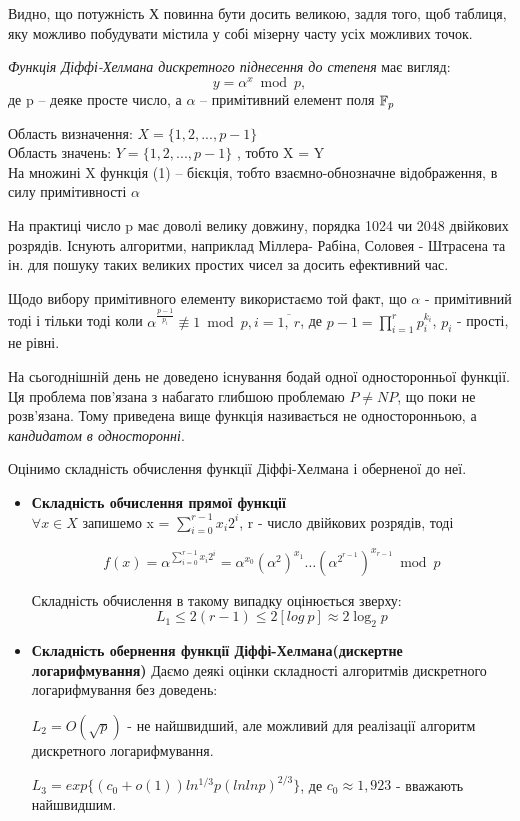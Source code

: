 Видно, що потужність $Х$ повинна бути досить великою, задля того, щоб таблиця, яку можливо побудувати містила у собі мізерну часту усіх можливих точок.

\begin{mydef}
\textit{Функція Діффі-Хелмана дискретного піднесення до степеня} має вигляд:
\[ y = \alpha^x \bmod p ,\]
де p -- деяке просте число, а $\alpha$ -- примітивний елемент поля $\mathbb F_{p}$
\end{mydef}
Область визначення: $X = \{1,2,...,p-1\}$ \\
Область значень: $Y = \{1,2,...,p-1\}$ , тобто X = Y \\
На множині X функція (1) -- бієкція, тобто взаємно-обнозначне відображення, в силу примітивності $\alpha$

На практиці число p має доволі велику довжину, порядка 1024 чи 2048 двійкових розрядів. Існують алгоритми, наприклад Міллера- Рабіна, Соловея - Штрасена та ін. для пошуку таких великих простих чисел за досить ефективний час.

Щодо вибору примітивного елементу використаємо той факт, що $\alpha$ - примітивний тоді і тільки тоді коли $\alpha^\frac{p-1}{p_{i}}\not\equiv 1 \bmod p, i = \overline{1,\ r}$, 
де $p-1 = \prod\limits_{i=1}^r p_i^{k_i}$, $p_{i}$ - прості, не рівні.

\begin{remark}
На сьогоднішній день не доведено існування бодай одної односторонньої функції. Ця проблема пов'язана з набагато глибшою проблемаю $P \neq NP$, що поки не розв'язана. Тому приведена вище функція називається не односторонньою, а \textit{кандидатом в односторонні}.
\end{remark}
Оцінимо складність обчислення функції Діффі-Хелмана і оберненої до неї.
\begin{itemize}

\item \textbf{Складність обчислення прямої функції}\\
$\forall x \in X $ запишемо x = $\sum_{i=0}^{r-1} x_i2^i $, r - число двійкових розрядів, тоді

\[f(x) = \alpha^{\sum_{i=0}^{r-1} x_i2^i} = \alpha^{x_0}(\alpha^{2})^{x_1}\dots(\alpha^{2^{r-1}})^{x_{r-1}} \bmod p\]

Складність обчислення в такому випадку оцінюється зверху: 
\[L_1 \leq 2(r-1) \leq 2[log\: p] \approx 2\log_2 p\]

\item \textbf{Складність обернення функції Діффі-Хелмана(дискертне логарифмування)}
Даємо деякі оцінки складності алгоритмів дискретного логарифмування без доведень:

$L_2 = O( \sqrt{p})$ - не найшвидший, але можливий для реалізації алгоритм дискретного логарифмування.

$L_3 = exp\{(c_0 + o(1)) ln^{1/3}p(lnlnp)^{2/3}\}$, де $c_0 \approx 1,923$ - вважають найшвидшим.

\end{itemize}

